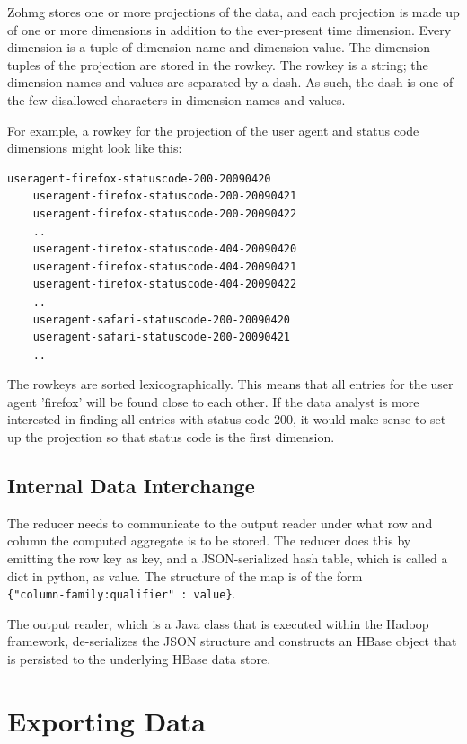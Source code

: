 Zohmg stores one or more projections of the data, and each projection is made up
of one or more dimensions in addition to the ever-present time dimension. Every
dimension is a tuple of dimension name and dimension value. The dimension tuples
of the projection are stored in the rowkey. The rowkey is a string; the
dimension names and values are separated by a dash. As such, the dash is one of
the few disallowed characters in dimension names and values.

For example, a rowkey for the projection of the user agent and status code
dimensions might look like this:

\begin{lstlisting}[caption=Example of rowkeys,captionpos=b]
    useragent-firefox-statuscode-200-20090420
    useragent-firefox-statuscode-200-20090421
    useragent-firefox-statuscode-200-20090422
    ..
    useragent-firefox-statuscode-404-20090420
    useragent-firefox-statuscode-404-20090421
    useragent-firefox-statuscode-404-20090422
    ..
    useragent-safari-statuscode-200-20090420
    useragent-safari-statuscode-200-20090421
    ..
\end{lstlisting}

The rowkeys are sorted lexicographically. This means that all entries for the
user agent 'firefox' will be found close to each other. If the data analyst is
more interested in finding all entries with status code 200, it would make sense
to set up the projection so that status code is the first dimension.


\subsection*{Internal Data Interchange}

The reducer needs to communicate to the output reader under what row and column
the computed aggregate is to be stored. The reducer does this by emitting the
row key as key, and a JSON-serialized hash table, which is called a dict in
python, as value. The structure of the map is of the form \\
\texttt{\{"column-family:qualifier" : value\}}.

The output reader, which is a Java class that is executed within the Hadoop
framework, de-serializes the JSON structure and constructs an HBase object that
is persisted to the underlying HBase data store.


\section{Exporting Data}

